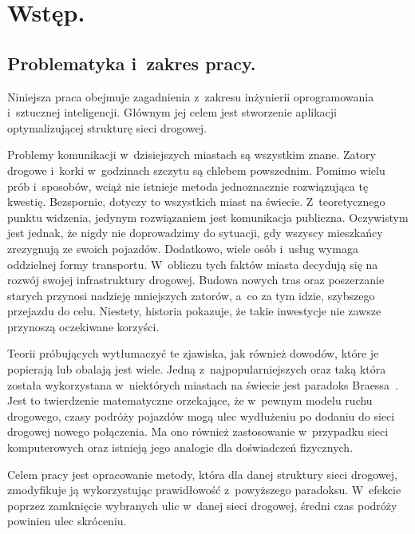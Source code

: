 \documentclass[twoside,12pt]{report}
\let\oldsection\chapter
\def\chapter{\cleardoublepage\oldsection}
\begin{document}


\tableofcontents	%

\chapter{Wstęp.} \label{rozdz.wstep} 

\section{Problematyka i~zakres pracy.}

Niniejsza praca obejmuje zagadnienia z~zakresu inżynierii oprogramowania i~sztucznej inteligencji. Głównym jej celem jest stworzenie aplikacji optymalizującej strukturę sieci drogowej.

Problemy komunikacji w~dzisiejszych miastach są wszystkim znane. Zatory drogowe i~korki w~godzinach szczytu są chlebem powszednim. Pomimo wielu prób i~sposobów, wciąż nie istnieje metoda jednoznacznie rozwiązująca tę kwestię. Bezspornie, dotyczy to wszystkich miast na świecie. Z~teoretycznego punktu widzenia, jedynym rozwiązaniem jest komunikacja publiczna. Oczywistym jest jednak, że nigdy nie doprowadzimy do sytuacji, gdy wszyscy mieszkańcy zrezygnują ze swoich pojazdów. Dodatkowo, wiele osób i~usług wymaga oddzielnej formy transportu. W~obliczu tych faktów miasta decydują się na rozwój swojej infrastruktury drogowej. Budowa nowych tras oraz poszerzanie starych przynosi nadzieję mniejszych zatorów, a~co za tym idzie, szybszego przejazdu do celu. Niestety, historia pokazuje, że takie inwestycje nie zawsze przynoszą oczekiwane korzyści.

Teorii próbujących wytłumaczyć te zjawiska, jak również dowodów, które je popierają lub obalają jest wiele. Jedną z~najpopularniejszych oraz taką która została wykorzystana w~niektórych miastach na świecie jest paradoks Braessa~\cite{braess}. Jest to twierdzenie matematyczne orzekające, że w~pewnym modelu ruchu drogowego, czasy podróży pojazdów mogą ulec wydłużeniu po dodaniu do sieci drogowej nowego połączenia. Ma ono również  zastosowanie w~przypadku  sieci komputerowych oraz istnieją jego analogie dla doświadczeń fizycznych.

Celem pracy jest opracowanie metody, która dla danej struktury sieci drogowej, zmodyfikuje ją wykorzystując prawidłowość z~powyższego paradoksu. W~efekcie poprzez zamknięcie wybranych ulic w~danej sieci drogowej, średni czas podróży powinien ulec skróceniu.
\end{document}
